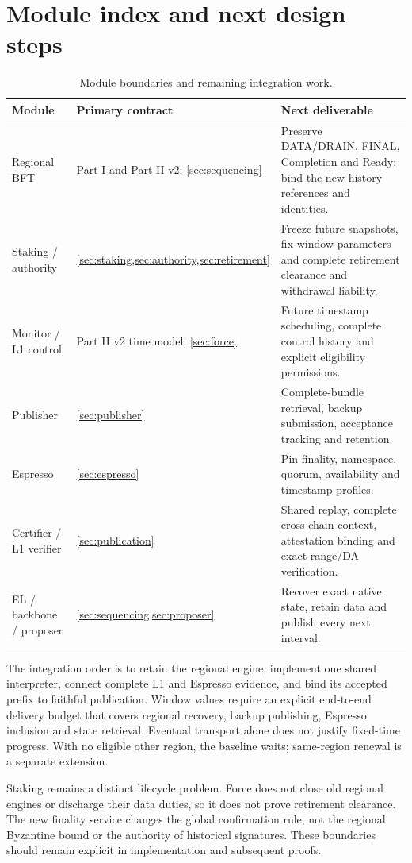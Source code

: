 \documentclass[11pt,a4paper]{article}
\begin{document}
\section{Module index and next design steps}\label{sec:index}
\begin{table}[H]\centering\small
\begin{tabularx}{\linewidth}{@{}p{.22\linewidth}Y Y@{}}
\toprule Module & Primary contract & Next deliverable\\\midrule
Regional BFT & Part I and Part II v2; \cref{sec:sequencing}
& Preserve DATA/DRAIN, FINAL, Completion and Ready; bind the new history
references and identities.\\
Staking / authority & \cref{sec:staking,sec:authority,sec:retirement}
& Freeze future snapshots, fix window parameters and complete retirement
clearance and withdrawal liability.\\
Monitor / L1 control & Part II v2 time model; \cref{sec:force}
& Future timestamp scheduling, complete control history and explicit
eligibility permissions.\\
Publisher & \cref{sec:publisher}
& Complete-bundle retrieval, backup submission, acceptance tracking and
retention.\\
Espresso & \cref{sec:espresso}
& Pin finality, namespace, quorum, availability and timestamp profiles.\\
Certifier / L1 verifier & \cref{sec:publication}
& Shared replay, complete cross-chain context, attestation binding and
exact range/DA verification.\\
EL / backbone / proposer & \cref{sec:sequencing,sec:proposer}
& Recover exact native state, retain data and publish every next interval.\\\bottomrule
\end{tabularx}
\caption{Module boundaries and remaining integration work.}
\end{table}

The integration order is to retain the regional engine, implement one
shared interpreter, connect complete L1 and Espresso evidence, and bind
its accepted prefix to faithful publication. Window values require an
explicit end-to-end delivery budget that covers regional recovery,
backup publishing, Espresso inclusion and state retrieval. Eventual
transport alone does not justify fixed-time progress. With no eligible
other region, the baseline waits; same-region renewal is a separate
extension.

Staking remains a distinct lifecycle problem. Force does not close old
regional engines or discharge their data duties, so it does not prove
retirement clearance. The new finality service changes the global
confirmation rule, not the regional Byzantine bound or the authority
of historical signatures. These boundaries should remain explicit in
implementation and subsequent proofs.
\end{document}
